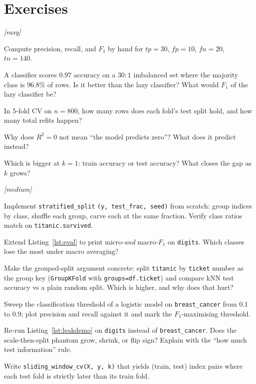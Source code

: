 \section*{Exercises}

\emph{[easy]}
\begin{exercise}
Compute precision, recall, and $F_1$ by hand for
$tp{=}30$, $fp{=}10$, $fn{=}20$, $tn{=}140$.
\end{exercise}
\begin{exercise}
A classifier scores $0.97$ accuracy on a $30{:}1$ imbalanced set where
the majority class is $96.8\%$ of rows. Is it better than the lazy
classifier? What would $F_1$ of the lazy classifier be?
\end{exercise}
\begin{exercise}
In $5$-fold CV on $n{=}800$, how many rows does each fold's test split
hold, and how many total refits happen?
\end{exercise}
\begin{exercise}
Why does $R^2{=}0$ not mean ``the model predicts zero''? What does it
predict instead?
\end{exercise}
\begin{exercise}
Which is bigger at $k{=}1$: train accuracy or test accuracy? What
closes the gap as $k$ grows?
\end{exercise}

\emph{[medium]}
\begin{exercise}
Implement \texttt{stratified\_split} \texttt{(y, test\_frac, seed)} from
scratch: group indices by class, shuffle each group, carve each at the
same fraction. Verify class ratios match on \texttt{titanic.survived}.
\end{exercise}
\begin{exercise}
Extend Listing~\ref{lst:eval} to print micro-\emph{and} macro-$F_1$ on
\texttt{digits}. Which classes lose the most under macro averaging?
\end{exercise}
\begin{exercise}
Make the grouped-split argument concrete: split \texttt{titanic} by
\texttt{ticket} number as the group key (\texttt{GroupKFold} with
\texttt{groups=df.ticket}) and compare kNN test accuracy vs a plain
random split. Which is higher, and why does that hurt?
\end{exercise}
\begin{exercise}
Sweep the classification threshold of a logistic model on
\texttt{breast\_cancer} from $0.1$ to $0.9$; plot precision and recall
against it and mark the $F_1$-maximising threshold.
\end{exercise}
\begin{exercise}
Re-run Listing~\ref{lst:leakdemo} on \texttt{digits} instead of
\texttt{breast\_cancer}. Does the scale-then-split phantom grow, shrink,
or flip sign? Explain with the ``how much test information'' rule.
\end{exercise}
\begin{exercise}
Write \texttt{sliding\_window\_cv(X, y, k)} that yields (train, test)
index pairs where each test fold is strictly later than its train fold.
\end{exercise}

